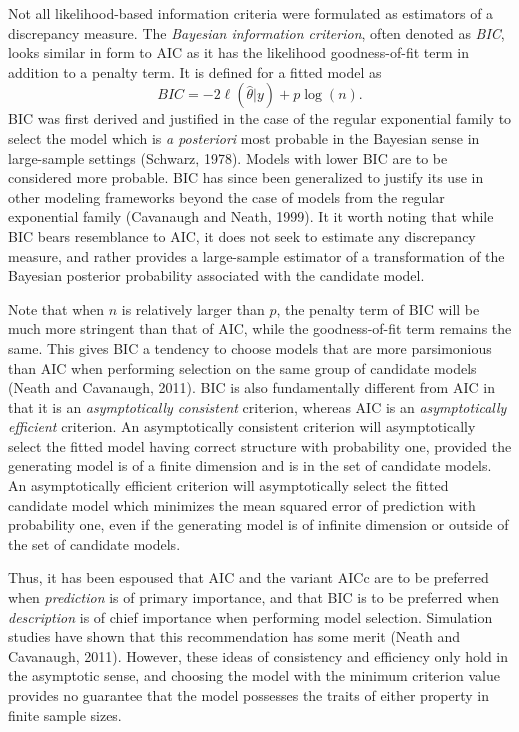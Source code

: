 		Not all likelihood-based information criteria were formulated as estimators of a discrepancy measure. The \textit{Bayesian information criterion}, often denoted as \textit{BIC}, looks similar in
		form to AIC as it has the likelihood goodness-of-fit term in addition to a penalty term. It is defined for a fitted model as
		\begin{equation*}
			BIC = -2 \ell(\hat{\theta}|y) + p \log (n).
		\end{equation*}
		BIC was first derived and justified in the case of the regular exponential family to select the model which is \textit{a posteriori} most probable in the Bayesian sense in
		large-sample settings (Schwarz, 1978). Models with lower BIC are to be considered more probable. BIC has since been generalized to justify its use in other modeling frameworks beyond
		the case of models from the regular exponential family (Cavanaugh and Neath, 1999). It it worth noting that while BIC bears resemblance to AIC, it does not seek to estimate any discrepancy
		measure, and rather provides a large-sample estimator of a transformation of the Bayesian posterior probability associated with the candidate model.

		Note that when $n$ is relatively larger than $p$, the penalty term of BIC will be much more stringent than that of AIC, while the goodness-of-fit term remains the same. This gives BIC a tendency to
		choose models that are more parsimonious than AIC when performing selection on the same group of candidate models (Neath and Cavanaugh, 2011). BIC is also fundamentally different
		from AIC in that it is an \textit{asymptotically consistent} criterion,  whereas AIC is an \textit{asymptotically efficient} criterion. An asymptotically consistent criterion will asymptotically
		select the fitted model having correct structure with probability one, provided the generating model is of a finite dimension and is in the set of candidate models. An asymptotically efficient
		criterion will asymptotically select the fitted candidate model which minimizes the mean squared error of prediction with probability one, even if the generating model is of infinite dimension
		or outside of the set of candidate models.

		Thus, it has been espoused that AIC and the variant AICc are to be preferred when \textit{prediction} is of primary importance, and that BIC is to be preferred
		when \textit{description} is of chief importance when performing model selection. Simulation studies have shown that this recommendation has some merit (Neath and Cavanaugh, 2011). However, these
		ideas of consistency and efficiency only hold in the asymptotic sense, and choosing the model with the minimum criterion value provides no guarantee that the model possesses the traits of either
		property in finite sample sizes.
		
